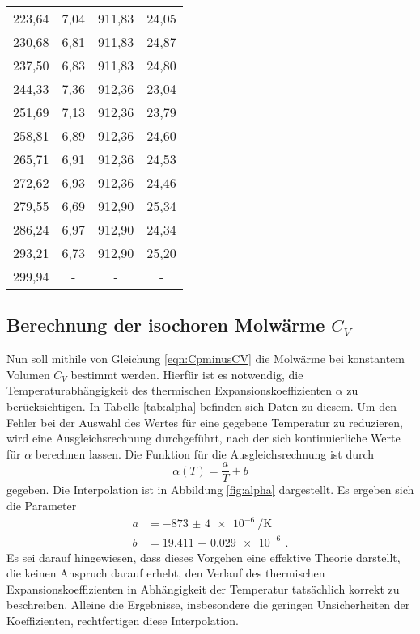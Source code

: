 \begin{table}[htp]
\begin{center}
\begin{tabular}{cccc}
			223,64 & 7,04 & 911,83 & 24,05\\
			230,68 & 6,81 & 911,83 & 24,87\\
			237,50 & 6,83 & 911,83 & 24,80\\
			244,33 & 7,36 & 912,36 & 23,04\\
			251,69 & 7,13 & 912,36 & 23,79\\
			258,81 & 6,89 & 912,36 & 24,60\\
			265,71 & 6,91 & 912,36 & 24,53\\
			272,62 & 6,93 & 912,36 & 24,46\\
			279,55 & 6,69 & 912,90 & 25,34\\
			286,24 & 6,97 & 912,90 & 24,34\\
			293,21 & 6,73 & 912,90 & 25,20\\
			299,94 & - & - & -\\
		\bottomrule
		\end{tabular}
	\end{center}
\end{table}


\subsection{Berechnung der isochoren Molwärme $C_V$}
\label{subsec:cv}

Nun soll mithile von Gleichung \eqref{eqn:CpminusCV} die Molwärme bei konstantem Volumen $C_V$ bestimmt werden.
Hierfür ist es notwendig, die Temperaturabhängigkeit des thermischen Expansionskoeffizienten
$\alpha$ zu berücksichtigen. In Tabelle \ref{tab:alpha} befinden sich Daten zu diesem.
Um den Fehler bei der Auswahl des Wertes für eine gegebene Temperatur zu reduzieren, wird eine Ausgleichsrechnung durchgeführt, nach der sich kontinuierliche Werte für $\alpha$ berechnen lassen.
Die Funktion für die Ausgleichsrechnung ist durch
\begin{equation*}
  \alpha(T)=\frac{a}{T}+b
\end{equation*}
gegeben. Die Interpolation ist in Abbildung \ref{fig:alpha} dargestellt. Es ergeben sich die Parameter
\begin{align*}
  a&=\SI{-873(4)e-6}{\per\kelvin} \,\\
  b&=\SI{19.411(29)e-6}{} \,.
\end{align*}
Es sei darauf hingewiesen, dass dieses Vorgehen eine effektive Theorie darstellt, die keinen Anspruch darauf erhebt, den Verlauf des thermischen Expansionskoeffizienten in Abhängigkeit der Temperatur tatsächlich korrekt zu beschreiben. Alleine die Ergebnisse, insbesondere die geringen Unsicherheiten der Koeffizienten, rechtfertigen diese Interpolation.

